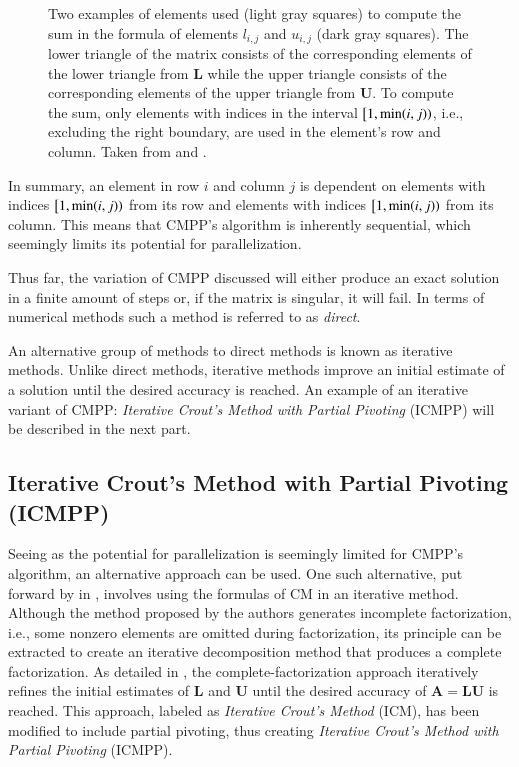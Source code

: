 \begin{figure}[ht!]
\begin{subfigure}{.5\textwidth}
		\label{Figure:theory->ICMPP->LUP->CMPP->sum-in-element-computation-dependance-U}
	\end{subfigure}
	\caption{Two examples of elements used (light gray squares) to compute the sum in the formula of elements $l_{i,j}$ and $u_{i,j}$ (dark gray squares).
		The lower triangle of the matrix consists of the corresponding elements of the lower triangle from $\mathbf{L}$ while the upper triangle consists of the corresponding elements of the upper triangle from $\mathbf{U}$.
		To compute the sum, only elements with indices in the interval $\left[1, \minp{i, j}\right)$, i.e., excluding the right boundary, are used in the element's row and column.
		Taken from  \cite{Cejka2022} and  \cite{Chow2015}.
		}
	\label{Figure:theory->ICMPP->LUP->CMPP->sum-in-element-computation-dependance}
\end{figure}

In summary, an element in row $i$ and column $j$ is dependent on elements with indices $\left[1, \minp{i, j}\right)$ from its row and elements with indices $\left[1, \minp{i, j}\right)$ from its column.
This means that CMPP's algorithm is inherently sequential, which seemingly limits its potential for parallelization.

Thus far, the variation of CMPP discussed will either produce an exact solution in a finite amount of steps or, if the matrix is singular, it will fail.
In terms of numerical methods such a method is referred to as \textit{direct}.

An alternative group of methods to direct methods is known as iterative methods.
Unlike direct methods, iterative methods improve an initial estimate of a solution until the desired accuracy is reached.
An example of an iterative variant of CMPP: \textit{Iterative Crout's Method with Partial Pivoting} (ICMPP) will be described in the next part.

\subsection{Iterative Crout's Method with Partial Pivoting (ICMPP)}\label{Subsection:theory->ICMPP->LUP->ICMPP}
Seeing as the potential for parallelization is seemingly limited for CMPP's algorithm, an alternative approach can be used.
One such alternative, put forward by  in  \cite{Anzt2019}, involves using the formulas of CM in an iterative method.
Although the method proposed by the authors generates incomplete factorization, i.e., some nonzero elements are omitted during factorization, its principle can be extracted to create an iterative decomposition method that produces a complete factorization.
As detailed in  \cite{Cejka2022}, the complete-factorization approach iteratively refines the initial estimates of $\mathbf{L}$ and $\mathbf{U}$ until the desired accuracy of $\mathbf{A} = \mathbf{LU}$ is reached.
This approach, labeled as \textit{Iterative Crout's Method} (ICM), has been modified to include partial pivoting, thus creating \textit{Iterative Crout's Method with Partial Pivoting} (ICMPP).

